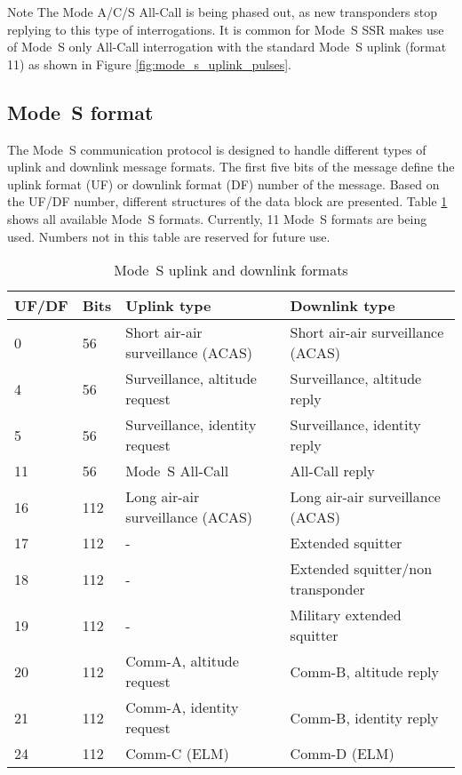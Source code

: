 \begin{notebox}{Note}
  The Mode A/C/S All-Call is being phased out, as new transponders stop replying to this type of interrogations. It is common for Mode~S SSR makes use of Mode~S only All-Call interrogation with the standard Mode~S uplink (format 11) as shown in Figure \ref{fig:mode_s_uplink_pulses}.
\end{notebox}


\subsection{Mode~S format}

The Mode~S communication protocol is designed to handle different types of uplink and downlink message formats. The first five bits of the message define the uplink format (UF) or downlink format (DF) number of the message. Based on the UF/DF number, different structures of the data block are presented. Table \ref{tb:mode_s_formats} shows all available Mode~S formats. Currently, 11 Mode~S formats are being used. Numbers not in this table are reserved for future use.

\begin{table}[ht]
\centering
\footnotesize
\caption{Mode~S uplink and downlink formats}
\label{tb:mode_s_formats}
\begin{tabular}{|l|l|l|l|}
\hline
\textbf{UF/DF} & \textbf{Bits} & \textbf{Uplink type} & \textbf{Downlink type} \\ \hline\hline
0 & 56 & Short air-air surveillance (ACAS) & Short air-air surveillance (ACAS) \\ \hline
4 & 56 & Surveillance, altitude request & Surveillance, altitude reply \\ \hline
5 & 56 & Surveillance, identity request & Surveillance, identity reply \\ \hline
11 & 56 & Mode~S All-Call & All-Call reply \\ \hline
\hline
16 & 112 & Long air-air surveillance (ACAS) & Long air-air surveillance (ACAS) \\ \hline
17 & 112 & - & Extended squitter \\ \hline
18 & 112 & - & Extended squitter/non transponder \\ \hline
19 & 112 & - & Military extended squitter \\ \hline
20 & 112 & Comm-A, altitude request & Comm-B, altitude reply \\ \hline
21 & 112 & Comm-A, identity request & Comm-B, identity reply \\ \hline
24 & 112 & Comm-C (ELM) & Comm-D (ELM) \\ \hline
\end{tabular}
\end{table}


